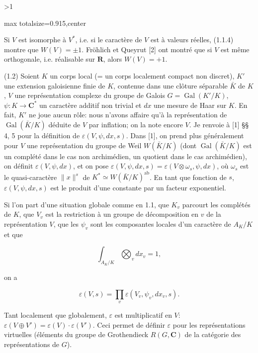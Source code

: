 \documentclass[9pt,twoside]{extarticle}
\newcommand{\EditionPage}[3]{%
  \ifnum#1>1\clearpage\fi
  \pdfbookmark[1]{Printed folio #2}{fr-folio-#2}%
  \hypertarget{fr-page-#1}{}%
  \noindent\begin{adjustbox}{max totalsize={\textwidth}{0.915\textheight},center}
  \begin{minipage}[t]{\textwidth}
  \fontsize{8.45}{10.05}\selectfont\justifying
  #3
  \end{minipage}
  \end{adjustbox}%
}
\begin{document}
\EditionPage{2}{300}{%
Si \(V\) est isomorphe à \(V^*\), i.e. si le caractère de \(V\) est à valeurs réelles, (1.1.4) montre que \(W(V)=\pm1\). Fröhlich et Queyrut [2] ont montré que si \(V\) est même orthogonale, i.e. réalisable sur \(\mathbf R\), alors \(W(V)=+1\).\par

(1.2) Soient \(K\) un corps local (= un corps localement compact non discret), \(K'\) une extension galoisienne finie de \(K\), contenue dans une clôture séparable \(\bar K\) de \(K\), \(V\) une représentation complexe du groupe de Galois \(G=\operatorname{Gal}(K'/K)\), \(\psi:K\to\mathbf C^*\) un caractère additif non trivial et \(dx\) une mesure de Haar sur \(K\). En fait, \(K'\) ne joue aucun rôle: nous n’avons affaire qu’à la représentation de \(\operatorname{Gal}(\bar K/K)\) déduite de \(V\) par inflation; on la note encore \(V\). Je renvoie à [1] §§ 4, 5 pour la définition de \(\varepsilon(V,\psi,dx,s)\). Dans [1], on prend plus généralement pour \(V\) une représentation du groupe de Weil \(W(\bar K/K)\) (dont \(\operatorname{Gal}(\bar K/K)\) est un complété dans le cas non archimédien, un quotient dans le cas archimédien), on définit \(\varepsilon(V,\psi,dx)\), et on pose \(\varepsilon(V,\psi,dx,s)=\varepsilon(V\otimes\omega_s,\psi,dx)\), où \(\omega_s\) est le quasi-caractère \(\lVert x\rVert^s\) de \(K^*\simeq W(\bar K/K)^{\mathrm{ab}}\). En tant que fonction de \(s\), \(\varepsilon(V,\psi,dx,s)\) est le produit d’une constante par un facteur exponentiel.\par

Si l’on part d’une situation globale comme en 1.1, que \(K_v\) parcourt les complétés de \(K\), que \(V_v\) est la restriction à un groupe de décomposition en \(v\) de la représentation \(V\), que les \(\psi_v\) sont les composantes locales d’un caractère de \(A_K/K\) et que\par

\[
\int_{A_K/K}\bigotimes_v dx_v=1,
\]

on a\par

\[
\tag{1.2.1} \varepsilon(V,s)=\prod_v\varepsilon(V_v,\psi_v,dx_v,s).
\]

Tant localement que globalement, \(\varepsilon\) est multiplicatif en \(V\): \(\varepsilon(V\oplus V')=\varepsilon(V)\cdot\varepsilon(V')\). Ceci permet de définir \(\varepsilon\) pour les représentations virtuelles (éléments du groupe de Grothendieck \(R(G,\mathbf C)\) de la catégorie des représentations de \(G\)).\par

}
\end{document}
